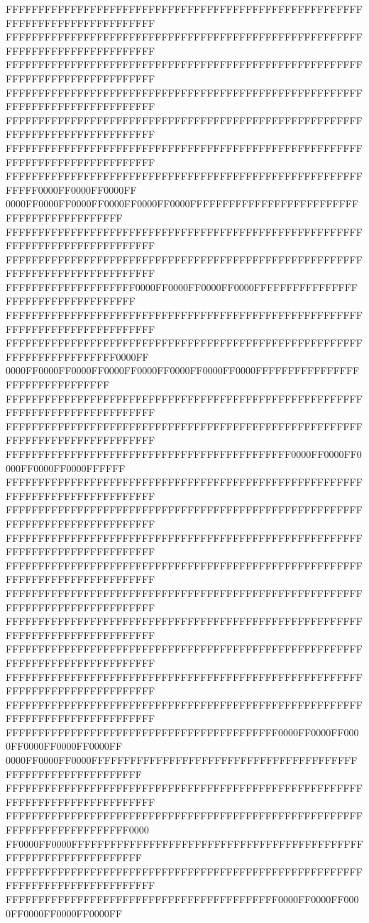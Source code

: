 FFFFFFFFFFFFFFFFFFFFFFFFFFFFFFFFFFFFFFFFFFFFFFFFFFFFFFFFFFFFFFFFFFFFFFFFFFFFFF
FFFFFFFFFFFFFFFFFFFFFFFFFFFFFFFFFFFFFFFFFFFFFFFFFFFFFFFFFFFFFFFFFFFFFFFFFFFFFF
FFFFFFFFFFFFFFFFFFFFFFFFFFFFFFFFFFFFFFFFFFFFFFFFFFFFFFFFFFFFFFFFFFFFFFFFFFFFFF
FFFFFFFFFFFFFFFFFFFFFFFFFFFFFFFFFFFFFFFFFFFFFFFFFFFFFFFFFFFFFFFFFFFFFFFFFFFFFF
FFFFFFFFFFFFFFFFFFFFFFFFFFFFFFFFFFFFFFFFFFFFFFFFFFFFFFFFFFFFFFFFFFFFFFFFFFFFFF
FFFFFFFFFFFFFFFFFFFFFFFFFFFFFFFFFFFFFFFFFFFFFFFFFFFFFFFFFFFFFFFFFFFFFFFFFFFFFF
FFFFFFFFFFFFFFFFFFFFFFFFFFFFFFFFFFFFFFFFFFFFFFFFFFFFFFFFFFFF0000FF0000FF0000FF
0000FF0000FF0000FF0000FF0000FF0000FFFFFFFFFFFFFFFFFFFFFFFFFFFFFFFFFFFFFFFFFFFF
FFFFFFFFFFFFFFFFFFFFFFFFFFFFFFFFFFFFFFFFFFFFFFFFFFFFFFFFFFFFFFFFFFFFFFFFFFFFFF
FFFFFFFFFFFFFFFFFFFFFFFFFFFFFFFFFFFFFFFFFFFFFFFFFFFFFFFFFFFFFFFFFFFFFFFFFFFFFF
FFFFFFFFFFFFFFFFFFFF0000FF0000FF0000FF0000FFFFFFFFFFFFFFFFFFFFFFFFFFFFFFFFFFFF
FFFFFFFFFFFFFFFFFFFFFFFFFFFFFFFFFFFFFFFFFFFFFFFFFFFFFFFFFFFFFFFFFFFFFFFFFFFFFF
FFFFFFFFFFFFFFFFFFFFFFFFFFFFFFFFFFFFFFFFFFFFFFFFFFFFFFFFFFFFFFFFFFFFFFFF0000FF
0000FF0000FF0000FF0000FF0000FF0000FF0000FF0000FFFFFFFFFFFFFFFFFFFFFFFFFFFFFFFF
FFFFFFFFFFFFFFFFFFFFFFFFFFFFFFFFFFFFFFFFFFFFFFFFFFFFFFFFFFFFFFFFFFFFFFFFFFFFFF
FFFFFFFFFFFFFFFFFFFFFFFFFFFFFFFFFFFFFFFFFFFFFFFFFFFFFFFFFFFFFFFFFFFFFFFFFFFFFF
FFFFFFFFFFFFFFFFFFFFFFFFFFFFFFFFFFFFFFFFFFFF0000FF0000FF0000FF0000FF0000FFFFFF
FFFFFFFFFFFFFFFFFFFFFFFFFFFFFFFFFFFFFFFFFFFFFFFFFFFFFFFFFFFFFFFFFFFFFFFFFFFFFF
FFFFFFFFFFFFFFFFFFFFFFFFFFFFFFFFFFFFFFFFFFFFFFFFFFFFFFFFFFFFFFFFFFFFFFFFFFFFFF
FFFFFFFFFFFFFFFFFFFFFFFFFFFFFFFFFFFFFFFFFFFFFFFFFFFFFFFFFFFFFFFFFFFFFFFFFFFFFF
FFFFFFFFFFFFFFFFFFFFFFFFFFFFFFFFFFFFFFFFFFFFFFFFFFFFFFFFFFFFFFFFFFFFFFFFFFFFFF
FFFFFFFFFFFFFFFFFFFFFFFFFFFFFFFFFFFFFFFFFFFFFFFFFFFFFFFFFFFFFFFFFFFFFFFFFFFFFF
FFFFFFFFFFFFFFFFFFFFFFFFFFFFFFFFFFFFFFFFFFFFFFFFFFFFFFFFFFFFFFFFFFFFFFFFFFFFFF
FFFFFFFFFFFFFFFFFFFFFFFFFFFFFFFFFFFFFFFFFFFFFFFFFFFFFFFFFFFFFFFFFFFFFFFFFFFFFF
FFFFFFFFFFFFFFFFFFFFFFFFFFFFFFFFFFFFFFFFFFFFFFFFFFFFFFFFFFFFFFFFFFFFFFFFFFFFFF
FFFFFFFFFFFFFFFFFFFFFFFFFFFFFFFFFFFFFFFFFFFFFFFFFFFFFFFFFFFFFFFFFFFFFFFFFFFFFF
FFFFFFFFFFFFFFFFFFFFFFFFFFFFFFFFFFFFFFFFFF0000FF0000FF0000FF0000FF0000FF0000FF
0000FF0000FF0000FFFFFFFFFFFFFFFFFFFFFFFFFFFFFFFFFFFFFFFFFFFFFFFFFFFFFFFFFFFFFF
FFFFFFFFFFFFFFFFFFFFFFFFFFFFFFFFFFFFFFFFFFFFFFFFFFFFFFFFFFFFFFFFFFFFFFFFFFFFFF
FFFFFFFFFFFFFFFFFFFFFFFFFFFFFFFFFFFFFFFFFFFFFFFFFFFFFFFFFFFFFFFFFFFFFFFFFF0000
FF0000FF0000FFFFFFFFFFFFFFFFFFFFFFFFFFFFFFFFFFFFFFFFFFFFFFFFFFFFFFFFFFFFFFFFFF
FFFFFFFFFFFFFFFFFFFFFFFFFFFFFFFFFFFFFFFFFFFFFFFFFFFFFFFFFFFFFFFFFFFFFFFFFFFFFF
FFFFFFFFFFFFFFFFFFFFFFFFFFFFFFFFFFFFFFFFFF0000FF0000FF0000FF0000FF0000FF0000FF
